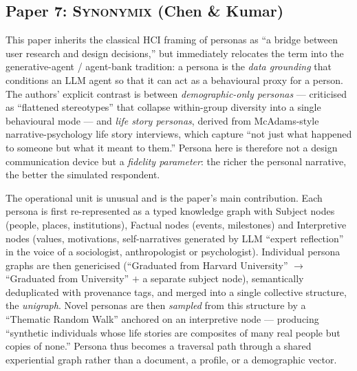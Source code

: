 

\subsection*{Paper 7: \textsc{Synonymix} (Chen \& Kumar)}

This paper inherits the classical HCI framing of personas as ``a bridge
between user research and design decisions,'' but immediately relocates the
term into the generative-agent / agent-bank tradition: a persona is the
\emph{data grounding} that conditions an LLM agent so that it can act as a
behavioural proxy for a person. The authors' explicit contrast is between
\emph{demographic-only personas} --- criticised as ``flattened stereotypes''
that collapse within-group diversity into a single behavioural mode --- and
\emph{life story personas}, derived from McAdams-style narrative-psychology
life story interviews, which capture ``not just what happened to someone but
what it meant to them.'' Persona here is therefore not a design communication
device but a \emph{fidelity parameter}: the richer the personal narrative, the
better the simulated respondent.

The operational unit is unusual and is the paper's main contribution. Each
persona is first re-represented as a typed knowledge graph with Subject nodes
(people, places, institutions), Factual nodes (events, milestones) and
Interpretive nodes (values, motivations, self-narratives generated by LLM
``expert reflection'' in the voice of a sociologist, anthropologist or
psychologist). Individual persona graphs are then genericised (``Graduated from
Harvard University'' $\rightarrow$ ``Graduated from University'' $+$ a separate
subject node), semantically deduplicated with provenance tags, and merged into
a single collective structure, the \emph{unigraph}. Novel personas are then
\emph{sampled} from this structure by a ``Thematic Random Walk'' anchored on an
interpretive node --- producing ``synthetic individuals whose life stories are
composites of many real people but copies of none.'' Persona thus becomes a
traversal path through a shared experiential graph rather than a document, a
profile, or a demographic vector.

